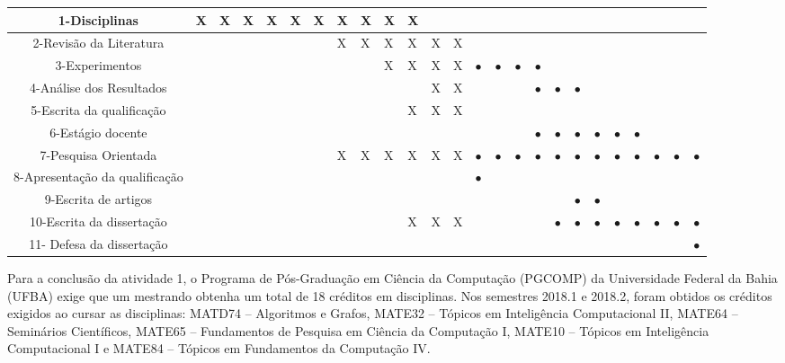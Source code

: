 \documentclass[msc, classic, a4paper]{ufbathesis}
\begin{document}
\begin{table}[htbp]
\begin{center}
{\begin{tabular}{|c|l|l|l|l|l|l|l|l|l|l|l|l|l|l|l|l|l|l|l|l|l|l|l|l|}
1-Disciplinas & X & X & X & X & X & X & X & X & X & X & ~ & ~ & ~ & ~ & ~ & ~ & ~ & ~ & ~ & ~ & ~ & ~ & ~ & ~ \\ \hline
2-Revisão da Literatura & ~ & ~ & ~ & ~ & ~ & ~ & X & X & X & X & X & X & ~ & ~ & ~ & ~ &  ~ & ~ & ~ & ~ & ~ & ~ & ~ & ~ \\ \hline
3-Experimentos  & ~ & ~ & ~ & ~ & ~ & ~ & ~ & ~ & X & X & X  & X & $\bullet$ & $\bullet$ & $\bullet$ & $\bullet$ & ~ & ~ & ~ & ~ & ~ & ~ & ~ & ~ \\ \hline
4-Análise dos Resultados & ~ & ~ & ~ & ~ & ~ & ~ & ~ & ~ & ~ & ~ & X & X & ~  & ~  & ~ & $\bullet$ & $\bullet$ & $\bullet$ & ~ & ~ & ~ & ~ & ~ & ~ \\ \hline
5-Escrita da qualificação & ~ & ~ & ~ & ~ & ~ & ~ & ~ & ~ & ~ & X & X & X & ~ & ~ & ~ & ~ & ~ & ~ & ~ & ~ & ~ & ~ & ~ & ~ \\ \hline
6-Estágio docente & ~ & ~ & ~ & ~ & ~ & ~ & ~ & ~ & ~ & ~ & ~ & ~ & ~ & ~ & ~ & $\bullet$ & $\bullet$ & $\bullet$ & $\bullet$ & $\bullet$ & $\bullet$ & ~ & ~ & ~ \\ \hline
7-Pesquisa Orientada & ~ & ~ & ~ & ~ & ~ & ~ & X & X & X & X & X & X & $\bullet$ & $\bullet$ & $\bullet$ & $\bullet$ & $\bullet$ & $\bullet$ & $\bullet$ & $\bullet$ & $\bullet$ & $\bullet$ & $\bullet$ & $\bullet$ \\ \hline
8-Apresentação da qualificação & ~ & ~ & ~ & ~ & ~ & ~ & ~ & ~ & ~ & ~ & ~ & ~ & $\bullet$ & ~ & ~ & ~ & ~ & ~ & ~ & ~ & ~ & ~ & ~ & ~ \\ \hline
9-Escrita de artigos& ~ & ~ & ~ & ~ & ~ & ~ & ~ & ~ & ~ & ~ & ~ & ~ & ~  & ~ & ~ & ~ & ~ & $\bullet$ & $\bullet$ & ~ & ~ & ~ & ~ & ~ \\ \hline
10-Escrita da dissertação& ~ & ~ & ~ & ~ & ~ & ~ & ~ & ~ & ~ & X & X & X & ~ & ~ & ~ & ~ & $\bullet$ & $\bullet$ & $\bullet$ & $\bullet$ & $\bullet$ & $\bullet$ & $\bullet$ & $\bullet$ \\ \hline
11- Defesa da dissertação& ~ & ~ & ~ & ~ & ~ & ~ & ~ & ~ & ~ & ~ & ~ & ~ & ~ & ~ & ~ & ~ & ~ & ~ & ~ & ~ & ~ & ~ & ~ & $\bullet$ \\ \hline

\hline
\end{tabular}
} %
\end{center}
\end{table}

Para a conclusão da atividade 1,
o Programa de Pós-Graduação em Ciência da Computação (PGCOMP) da Universidade Federal da Bahia (UFBA) exige que um mestrando obtenha um total de 18 créditos em disciplinas.
Nos semestres 2018.1 e 2018.2, foram obtidos os créditos exigidos ao cursar as disciplinas:
MATD74 -- Algoritmos e Grafos, MATE32 -- Tópicos em Inteligência Computacional II, MATE64 -- Seminários Científicos, MATE65 -- Fundamentos de Pesquisa em Ciência da Computação I,
MATE10 -- Tópicos em Inteligência Computacional I e MATE84 -- Tópicos em Fundamentos da Computação IV.
\end{document}
